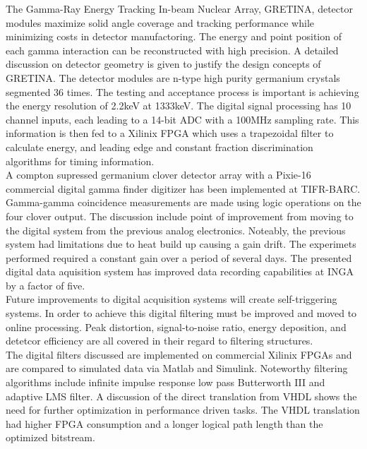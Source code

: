 \documentclass[12pt]{article}
\begin{document}
{\large\textbf{\cite{Paschalis201344}}}
The Gamma-Ray Energy Tracking In-beam Nuclear Array, GRETINA, detector modules maximize solid angle coverage and tracking performance while minimizing costs in detector manufactoring. The energy and point position of each gamma interaction can be reconstructed with high precision. A detailed discussion on detector geometry is given to justify the design concepts of GRETINA. The detector modules are n-type high purity germanium crystals segmented 36 times. The testing and acceptance process is important is achieving the energy resolution of 2.2keV at 1333keV. The digital signal processing has 10 channel inputs, each leading to a 14-bit ADC with a 100MHz sampling rate. This information is then fed to a Xilinix FPGA which uses a trapezoidal filter to calculate energy, and leading edge and constant fraction discrimination algorithms for timing information.
\\[20pt]


{\large\textbf{\cite{Palit201290}}}
A compton supressed germanium clover detector array with a Pixie-16 commercial digital gamma finder digitizer has been implemented at TIFR-BARC. Gamma-gamma coincidence measurements are made using logic operations on the four clover output. The discussion include point of improvement from moving to the digital system from the previous analog electronics. Noteably, the previous system had limitations due to heat build up causing a gain drift. The experimets performed required a constant gain over a period of several days. The presented digital data aquisition system has improved data recording capabilities at INGA by a factor of five.
\\[20pt]


{\large\textbf{\cite{Alberto200999}}}
Future improvements to digital acquisition systems will create self-triggering systems. In order to achieve this digital filtering must be improved and moved to online processing. Peak distortion, signal-to-noise ratio, energy deposition, and detetcor efficiency are all covered in their regard to filtering structures.
\\
The digital filters discussed are implemented on commercial Xilinix FPGAs and are compared to simulated data via Matlab and Simulink. Noteworthy filtering algorithms include infinite impulse response low pass Butterworth III and adaptive LMS filter. A discussion of the direct translation from VHDL shows the need for further optimization in performance driven tasks. The VHDL translation had higher FPGA consumption and a longer logical path length than the optimized bitstream.
\\[20pt]
\end{document}
